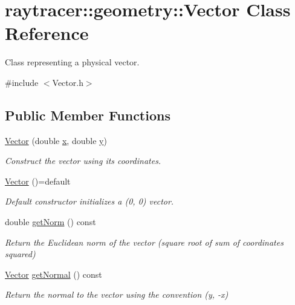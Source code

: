 \hypertarget{classraytracer_1_1geometry_1_1Vector}{}\section{raytracer\+:\+:geometry\+:\+:Vector Class Reference}
\label{classraytracer_1_1geometry_1_1Vector}


Class representing a physical vector.  




{\ttfamily \#include $<$Vector.\+h$>$}

\subsection*{Public Member Functions}
\begin{DoxyCompactItemize}
\item 
\hyperlink{classraytracer_1_1geometry_1_1Vector_acd5cb78949603529e271310395459440}{Vector} (double \hyperlink{classraytracer_1_1geometry_1_1Vector_a954a5ffca3169512b63cf6d2530d957f}{x}, double \hyperlink{classraytracer_1_1geometry_1_1Vector_a6f94f809967bec250380eb2fa91492c2}{y})
\begin{DoxyCompactList}\small\item\em Construct the vector using its coordinates. \end{DoxyCompactList}\item 
\mbox{\label{classraytracer_1_1geometry_1_1Vector_a2934dbfb44caa33bf0ac822f97fcd0b6}} 
\hyperlink{classraytracer_1_1geometry_1_1Vector_a2934dbfb44caa33bf0ac822f97fcd0b6}{Vector} ()=default
\begin{DoxyCompactList}\small\item\em Default constructor initializes a (0, 0) vector. \end{DoxyCompactList}\item 
double \hyperlink{classraytracer_1_1geometry_1_1Vector_ac16dbbd95d3e439c6d4b81bf249d1e83}{get\+Norm} () const
\begin{DoxyCompactList}\small\item\em Return the Euclidean norm of the vector (square root of sum of coordinates squared) \end{DoxyCompactList}\item 
\hyperlink{classraytracer_1_1geometry_1_1Vector}{Vector} \hyperlink{classraytracer_1_1geometry_1_1Vector_a49b341cfda70b916ed0c200feb8bad50}{get\+Normal} () const
\begin{DoxyCompactList}\small\item\em Return the normal to the vector using the convention (y, -\/x) \end{DoxyCompactList}\end{DoxyCompactItemize}
